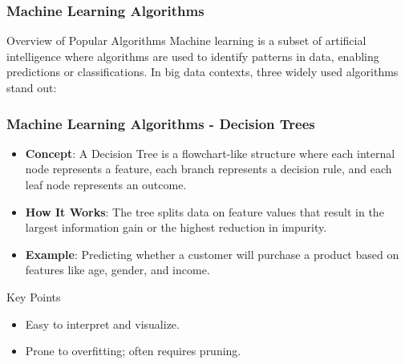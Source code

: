 \documentclass[aspectratio=169]{beamer}
\begin{document}
\begin{frame}[fragile]
    \frametitle{Machine Learning Algorithms}
    \begin{block}{Overview of Popular Algorithms}
        Machine learning is a subset of artificial intelligence where algorithms are used to identify patterns in data, enabling predictions or classifications. In big data contexts, three widely used algorithms stand out:
    \end{block}
\end{frame}

\begin{frame}[fragile]
    \frametitle{Machine Learning Algorithms - Decision Trees}
    \begin{itemize}
        \item \textbf{Concept}: A Decision Tree is a flowchart-like structure where each internal node represents a feature, each branch represents a decision rule, and each leaf node represents an outcome.
        \item \textbf{How It Works}: The tree splits data on feature values that result in the largest information gain or the highest reduction in impurity.
        \item \textbf{Example}: Predicting whether a customer will purchase a product based on features like age, gender, and income.
    \end{itemize}
    
    \begin{block}{Key Points}
        \begin{itemize}
            \item Easy to interpret and visualize.
            \item Prone to overfitting; often requires pruning.
        \end{itemize}
    \end{block}
\end{frame}
\end{document}
